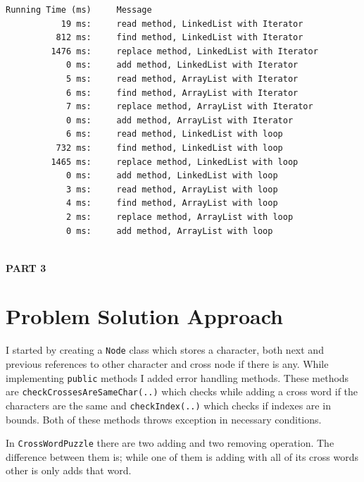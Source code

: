 \documentclass[a4paper]{article}
\begin{document}
\begin{large}
\begin{lstlisting}[caption=Log file]
Running Time (ms)     Message
           19 ms:     read method, LinkedList with Iterator
          812 ms:     find method, LinkedList with Iterator
         1476 ms:     replace method, LinkedList with Iterator
            0 ms:     add method, LinkedList with Iterator
            5 ms:     read method, ArrayList with Iterator
            6 ms:     find method, ArrayList with Iterator
            7 ms:     replace method, ArrayList with Iterator
            0 ms:     add method, ArrayList with Iterator
            6 ms:     read method, LinkedList with loop
          732 ms:     find method, LinkedList with loop
         1465 ms:     replace method, LinkedList with loop
            0 ms:     add method, LinkedList with loop
            3 ms:     read method, ArrayList with loop
            4 ms:     find method, ArrayList with loop
            2 ms:     replace method, ArrayList with loop
            0 ms:     add method, ArrayList with loop
\end{lstlisting}

\newpage

\begin{center}
  \textbf{ \\
  \vspace{3cm}
  \Huge{PART 3}
  }
\end{center}

\newpage

\setcounter{section}{0}

\section{Problem Solution Approach}

I started by creating a \texttt{Node} class which stores a character, both next and previous references to other character and cross node if there is any. While implementing \texttt{public} methods I added error handling methods. These methods are \texttt{checkCrossesAreSameChar(..)} which checks while adding a cross word if the characters are the same and \texttt{checkIndex(..)} which checks if indexes are in bounds. Both of these methods throws exception in necessary conditions.
\vspace{1em}

In \texttt{CrossWordPuzzle} there are two adding and two removing operation. The difference between them is; while one of them is adding with all of its cross words other is only adds that word.
\vspace{1em}


\end{large}
\end{document}
